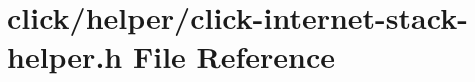 \hypertarget{click-internet-stack-helper_8h}{}\section{click/helper/click-\/internet-\/stack-\/helper.h File Reference}
\label{click-internet-stack-helper_8h}
